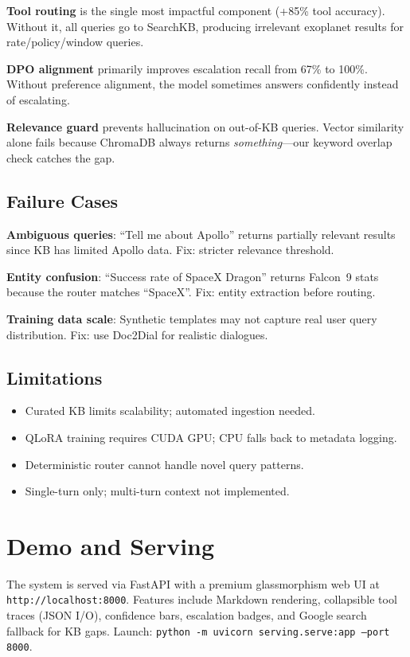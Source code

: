 \documentclass{article}
\begin{document}
\textbf{Tool routing} is the single most impactful component (+85\% tool accuracy). Without it, all queries go to SearchKB, producing irrelevant exoplanet results for rate/policy/window queries.

\textbf{DPO alignment} primarily improves escalation recall from 67\% to 100\%. Without preference alignment, the model sometimes answers confidently instead of escalating.

\textbf{Relevance guard} prevents hallucination on out-of-KB queries. Vector similarity alone fails because ChromaDB always returns \textit{something}---our keyword overlap check catches the gap.

\subsection{Failure Cases}

\textbf{Ambiguous queries}: ``Tell me about Apollo'' returns partially relevant results since KB has limited Apollo data. Fix: stricter relevance threshold.

\textbf{Entity confusion}: ``Success rate of SpaceX Dragon'' returns Falcon~9 stats because the router matches ``SpaceX''. Fix: entity extraction before routing.

\textbf{Training data scale}: Synthetic templates may not capture real user query distribution. Fix: use Doc2Dial for realistic dialogues.

\subsection{Limitations}
\begin{itemize}[noitemsep]
    \item Curated KB limits scalability; automated ingestion needed.
    \item QLoRA training requires CUDA GPU; CPU falls back to metadata logging.
    \item Deterministic router cannot handle novel query patterns.
    \item Single-turn only; multi-turn context not implemented.
\end{itemize}

\section{Demo and Serving}

The system is served via FastAPI with a premium glassmorphism web UI at \texttt{http://localhost:8000}. Features include Markdown rendering, collapsible tool traces (JSON I/O), confidence bars, escalation badges, and Google search fallback for KB gaps. Launch: \texttt{python -m uvicorn serving.serve:app --port 8000}.
\end{document}
